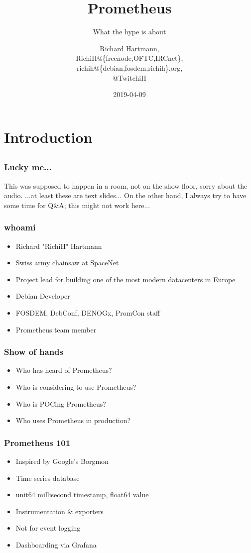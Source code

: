 \documentclass[aspectratio=169]{beamer}
\title{Prometheus}
\subtitle{What the hype is about}
\author{Richard Hartmann,\\
RichiH@\{freenode,OFTC,IRCnet\},\\
richih@\{debian,fosdem,richih\}.org,\\
@TwitchiH}
\date{2019-04-09}
\begin{document}
\section{Introduction}


\subsection{}

\begin{frame}
	\titlepage
\end{frame}

\begin{frame}
	\frametitle{Lucky me...}
	\vfill
	This was supposed to happen in a room, not on the show floor, sorry about the audio.
	\vfill
	...at least these are text slides...
	\vfill
	On the other hand, I always try to have some time for Q\&A; this might not work here...
	\vfill
\end{frame}

\begin{frame}
	\frametitle{whoami}
	\begin{itemize}
		\item Richard "RichiH" Hartmann
		\item Swiss army chainsaw at SpaceNet
		\item Project lead for building one of the most modern datacenters in Europe
		\item Debian Developer
		\item FOSDEM, DebConf, DENOGx, PromCon staff
		\item Prometheus team member
	\end{itemize}
\end{frame}

\begin{frame}
	\frametitle{Show of hands}
	\begin{itemize}
		\item Who has heard of Prometheus?
		\item Who is considering to use Prometheus?
		\item Who is POCing Prometheus?
		\item Who uses Prometheus in production?
	\end{itemize}
\end{frame}

\begin{frame}
	\frametitle{Prometheus 101}
	\begin{itemize}
		\item Inspired by Google's Borgmon
		\item Time series database
		\item unit64 millisecond timestamp, float64 value
		\item Instrumentation \& exporters
		\item Not for event logging
		\item Dashboarding via Grafana
	\end{itemize}
\end{frame}
\end{document}
